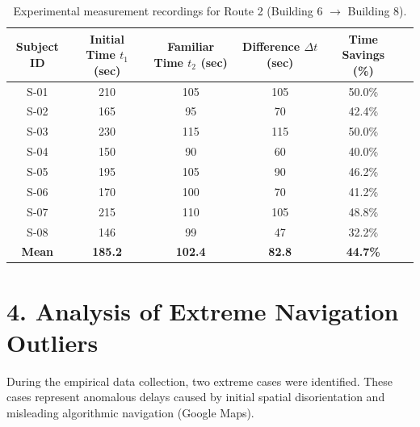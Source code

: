\documentclass[11pt, a4paper]{article}
\begin{document}
\begin{table}[h!]
\centering
\small
\begin{tabular}{cccccc}
\toprule
\textbf{Subject ID} & \textbf{Initial Time $t_1$ (sec)} & \textbf{Familiar Time $t_2$ (sec)} & \textbf{Difference $\Delta t$ (sec)} & \textbf{Time Savings (\%)} \\
\midrule
S-01 & 210 & 105 & 105 & 50.0\% \\
S-02 & 165 & 95  & 70  & 42.4\% \\
S-03 & 230 & 115 & 115 & 50.0\% \\
S-04 & 150 & 90  & 60  & 40.0\% \\
S-05 & 195 & 105 & 90  & 46.2\% \\
S-06 & 170 & 100 & 70  & 41.2\% \\
S-07 & 215 & 110 & 105 & 48.8\% \\
S-08 & 146 & 99  & 47  & 32.2\% \\
\midrule
\textbf{Mean} & \textbf{185.2} & \textbf{102.4} & \textbf{82.8} & \textbf{44.7\%} \\
\bottomrule
\end{tabular}
\caption{Experimental measurement recordings for Route 2 (Building 6 $\rightarrow$ Building 8).}
\end{table}

\vspace{1em}


\section*{4. Analysis of Extreme Navigation Outliers}

During the empirical data collection, two extreme cases were identified. These cases represent anomalous delays caused by initial spatial disorientation and misleading algorithmic navigation (Google Maps).

\vspace{0.5em}
\end{document}
